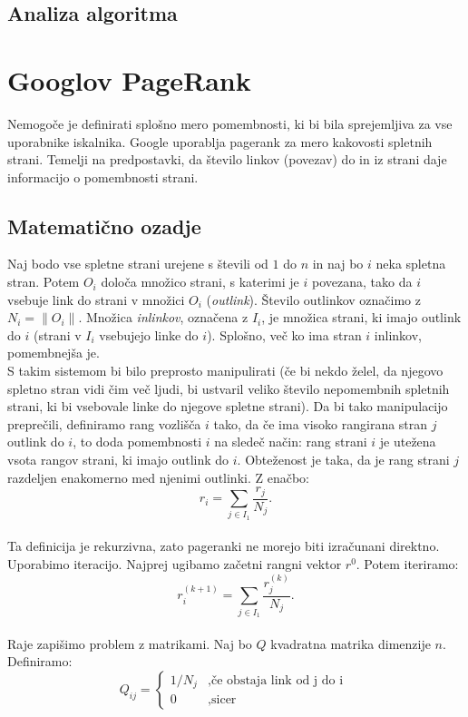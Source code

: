 \documentclass[a4paper]{article}
\begin{document}
\subsection{Analiza algoritma}


\section{Googlov PageRank}
\hspace{4.8mm}Nemogoče je definirati splošno mero pomembnosti, ki bi bila sprejemljiva za vse uporabnike iskalnika. Google uporablja pagerank za mero kakovosti spletnih strani. Temelji na predpostavki, da število linkov (povezav) do in iz strani daje informacijo o pomembnosti strani. \\
\subsection{Matematično ozadje}
Naj bodo vse spletne strani urejene s števili od $1$ do $n$ in naj bo $i$ neka spletna stran. Potem $O_i$ določa množico strani, s katerimi je $i$ povezana, tako da $i$ vsebuje link do strani v množici $O_i$ (\textit{outlink}). Število outlinkov označimo z $N_i = \|O_i\|$. Množica \textit{inlinkov}, označena z $I_i$, je množica strani, ki imajo outlink do $i$ (strani v $I_i$ vsebujejo linke do $i$).
Splošno, več ko ima stran $i$ inlinkov, pomembnejša je. \\ S takim sistemom bi bilo preprosto manipulirati (če bi nekdo želel, da njegovo spletno stran vidi čim več ljudi, bi ustvaril veliko število nepomembnih spletnih strani, ki bi vsebovale linke do njegove spletne strani). Da bi tako manipulacijo preprečili, definiramo rang vozlišča $i$ tako, da če ima visoko rangirana stran $j$ outlink do $i$, to doda pomembnosti $i$ na sledeč način: rang strani $i$ je utežena vsota rangov strani, ki imajo outlink do $i$. Obteženost  je taka, da je rang strani $j$ razdeljen enakomerno med njenimi outlinki. Z enačbo: $$r_i = \sum_{j \in I_1} \frac{r_j}{N_j}.$$ \\
Ta definicija je rekurzivna, zato pageranki ne morejo biti izračunani direktno. Uporabimo iteracijo. Najprej ugibamo začetni rangni vektor $r^0$. Potem iteriramo:
$$r_i^{(k+1)} = \sum_{j \in I_1} \frac{r_j^{(k)}}{N_j}.$$ \\
Raje zapišimo problem z matrikami. Naj bo $Q$ kvadratna matrika dimenzije $n$. Definiramo:
\[
Q_{ij} = 
\left \{
	\begin{array}{ll}
		1/N_j  &, \mbox{če obstaja link od j do i }  \\
		0 &, \mbox{sicer} 
	\end{array}
\right. \]
\end{document}
